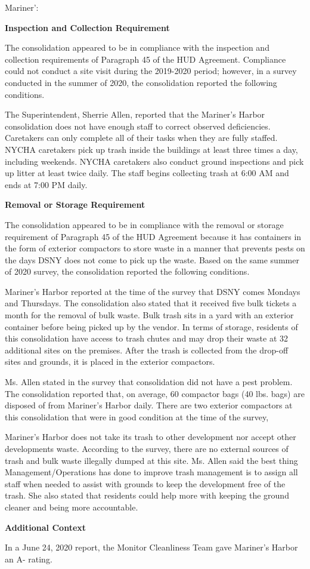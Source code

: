 Mariner': 

\textbf{Inspection and Collection Requirement} 

 

The consolidation appeared to be in compliance with the inspection and collection requirements of Paragraph 45 of the HUD Agreement. Compliance could not conduct a site visit during the 2019-2020 period; however, in a survey conducted in the summer of 2020, the consolidation reported the following conditions.

The Superintendent, Sherrie Allen, reported that the Mariner's Harbor consolidation does not have enough staff to correct observed deficiencies. Caretakers can only complete all of their tasks when they are fully staffed. NYCHA caretakers pick up trash inside the buildings at least three times a day, including weekends. NYCHA caretakers also conduct ground inspections and pick up litter at least twice daily. The staff begins collecting trash at 6:00 AM and ends at 7:00 PM daily.

\textbf{Removal or Storage Requirement} 

The consolidation appeared to be in compliance with the removal or storage requirement of Paragraph  45 of the HUD Agreement because it has containers in the form of exterior compactors to store waste in a manner that prevents pests on the days DSNY does not come to pick up the waste. Based on the same summer of  2020  survey, the consolidation reported the following conditions.

  

Mariner's Harbor reported at the time of the survey that DSNY comes Mondays and Thursdays. The consolidation also stated that it received five bulk tickets a month for the removal of bulk waste. Bulk trash sits in a yard with an exterior container before being picked up by the vendor. In terms of storage, residents of this consolidation have access to trash chutes and may drop their waste at 32 additional sites on the premises. After the trash is collected from the drop-off sites and grounds, it is placed in the exterior compactors. 

 

Ms. Allen stated in the survey that consolidation did not have a pest problem. The consolidation reported that, on average, 60 compactor bags (40 lbs. bags)  are disposed of from Mariner's Harbor daily. There are two exterior compactors at this consolidation that were in good condition at the time of the survey, 

Mariner's Harbor does not take its trash to other development nor accept other developments waste. According to the survey, there are no external sources of trash and bulk waste illegally dumped at this site. Ms. Allen said the best thing Management/Operations has done to improve trash management is to assign all staff when needed to assist with grounds to keep the development free of the trash. She also stated that residents could help more with keeping the ground cleaner and being more accountable. 


\textbf{Additional Context}  

In a June 24, 2020 report, the Monitor Cleanliness Team gave Mariner's Harbor an A- rating.  

 